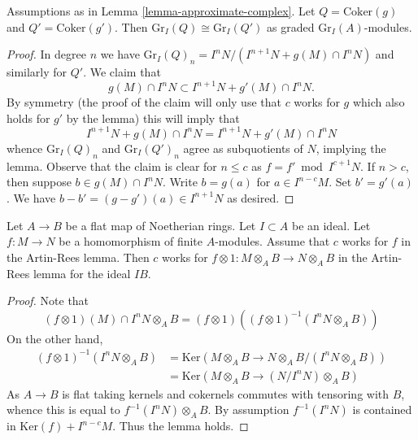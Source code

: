 \begin{lemma}
\label{lemma-approximate-complex-graded}
Assumptions as in Lemma \ref{lemma-approximate-complex}.
Let $Q = \text{Coker}(g)$ and $Q' = \text{Coker}(g')$. Then
$\text{Gr}_I(Q) \cong \text{Gr}_I(Q')$
as graded $\text{Gr}_I(A)$-modules.
\end{lemma}

\begin{proof}
In degree $n$ we have
$\text{Gr}_I(Q)_n = I^nN/(I^{n + 1}N + g(M) \cap I^nN)$
and similarly for $Q'$. We claim that
$$
g(M) \cap I^nN \subset I^{n + 1}N + g'(M) \cap I^nN.
$$
By symmetry (the proof of the claim will only use that $c$ works
for $g$ which also holds for $g'$ by the lemma) this will imply that
$$
I^{n + 1}N + g(M) \cap I^nN = I^{n + 1}N + g'(M) \cap I^nN
$$
whence $\text{Gr}_I(Q)_n$ and $\text{Gr}_I(Q')_n$ agree as subquotients
of $N$, implying the lemma. Observe that the claim is clear for
$n \leq c$ as $f = f' \bmod I^{c + 1}N$. If $n > c$, then suppose
$b \in g(M) \cap I^nN$. Write $b = g(a)$ for $a \in I^{n - c}M$.
Set $b' = g'(a)$. We have $b - b' = (g - g')(a) \in I^{n + 1}N$
as desired.
\end{proof}

\begin{lemma}
\label{lemma-works-flat-extension}
Let $A \to B$ be a flat map of Noetherian rings. Let $I \subset A$ be
an ideal. Let $f : M \to N$ be a homomorphism of finite $A$-modules.
Assume that $c$ works for $f$ in the Artin-Rees lemma. Then $c$ works for
$f \otimes 1 : M \otimes_A B \to N \otimes_A B$ in the Artin-Rees lemma
for the ideal $IB$.
\end{lemma}

\begin{proof}
Note that
$$
(f \otimes 1)(M) \cap I^n N \otimes_A B
= (f \otimes 1)\left((f \otimes 1)^{-1}(I^n N \otimes_A B)\right)
$$
On the other hand,
\begin{align*}
(f \otimes 1)^{-1}(I^n N \otimes_A B) &
= \text{Ker}(M \otimes_A B \to N \otimes_A B/(I^n N \otimes_A B)) \\
& =
\text{Ker}(M \otimes_A B \to (N/I^nN) \otimes_A B)
\end{align*}
As $A \to B$ is flat taking kernels and cokernels commutes with
tensoring with $B$, whence this is equal to
$f^{-1}(I^nN) \otimes_A B$. By assumption $f^{-1}(I^nN)$ is contained in
$\text{Ker}(f) + I^{n - c}M$. Thus the lemma holds.
\end{proof}








